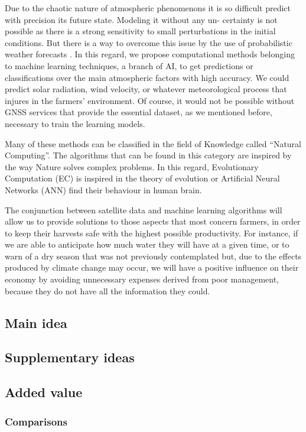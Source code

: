 Due to the chaotic nature of atmospheric phenomenons it is so difficult predict with precision its future state. Modeling it without any un- certainty is not possible as there is a strong sensitivity to small perturbations in the initial conditions. But there is a way to overcome this issue by the use of probabilistic weather forecasts \cite{martinez2015forecasting}. In this regard, we propose computational methods belonging to machine learning techniques, a branch of AI, to get predictions or classifications over the main atmospheric factors with high accuracy. We could predict solar radiation, wind velocity, or whatever meteorological process that injures in the farmers' environment. Of course, it would not be possible without GNSS services that provide the essential dataset, as we mentioned before, necessary to train the learning models.

Many of these methods can be classified in the field of Knowledge called “Natural Computing”. The algorithms that can be found in this category are inspired by the way Nature solves complex problems. In this regard, Evolutionary Computation (EC) is inspired in the theory of evolution or Artificial Neural Networks (ANN) find their behaviour in human brain.

The conjunction between satellite data and machine learning algorithms will allow us to provide solutions to those aspects that most concern farmers, in order to keep their harvests safe with the highest possible productivity. For instance, if we are able to anticipate how much water they will have at a given time, or to warn of a dry season that was not previously contemplated but, due to the effects produced by climate change may occur, we will have a positive influence on their economy by avoiding unnecessary expenses derived from poor management, because they do not have all the information they could.


\subsection{Main idea}
\subsection{Supplementary ideas}
\subsection{Added value}
\subsubsection{Comparisons}	
